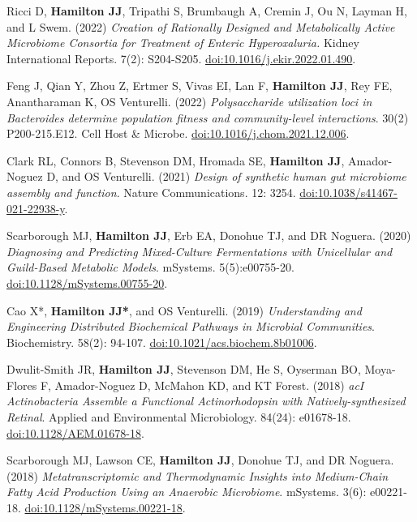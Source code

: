 \documentclass[letterpaper,11pt]{article}
\newlength{\outerbordwidth}
\newcommand{\resheading}[1]{\vspace{8pt}
  \parbox{\textwidth}{
  \setlength{\FrameSep}{\outerbordwidth}
\setlength{\fboxsep}{0pt}
\framebox[\textwidth][l]{\setlength{\fboxsep}{4pt}\fcolorbox{shadecolorB}{shadecolorB}{\textbf{\sffamily{\mbox{~}\makebox[6.262in][l]{\large #1} \vphantom{p\^{E}}}}}}
  }
  \vspace{-5pt}
}
\begin{document}
\resheading{Publications}
\begin{etaremune}[itemsep=-2pt]
	\item Ricci D, \textbf{Hamilton JJ}, Tripathi S, Brumbaugh A, Cremin J, Ou N, Layman H, and L Swem. (2022) \emph{Creation of Rationally Designed and Metabolically Active Microbiome Consortia for Treatment of Enteric Hyperoxaluria.} Kidney International Reports. 7(2): S204-S205. \href{https://www.kireports.org/article/S2468-0249(22)00490-9/fulltext}{doi:10.1016/j.ekir.2022.01.490}.
	\item Feng J, Qian Y, Zhou Z, Ertmer S, Vivas EI, Lan F, \textbf{Hamilton JJ}, Rey FE, Anantharaman K, OS Venturelli. (2022) \emph{Polysaccharide utilization loci in Bacteroides determine population fitness and community-level interactions}. 30(2) P200-215.E12. Cell Host \& Microbe. \href{https://www.cell.com/cell-host-microbe/fulltext/S1931-3128(21)00577-1}{doi:10.1016/j.chom.2021.12.006}.
	\item Clark RL, Connors B, Stevenson DM, Hromada SE, \textbf{Hamilton JJ}, Amador-Noguez D, and OS Venturelli. (2021) \emph{Design of synthetic human gut microbiome assembly and function}. Nature Communications. 12: 3254. \href{https://www.nature.com/articles/s41467-021-22938-y}{doi:10.1038/s41467-021-22938-y}.
	\item Scarborough MJ, \textbf{Hamilton JJ}, Erb EA, Donohue TJ, and DR Noguera. (2020) \emph{Diagnosing and Predicting Mixed-Culture Fermentations with Unicellular and Guild-Based Metabolic Models}. mSystems. 5(5):e00755-20. \href{https://doi.org/10.1128/mSystems.00755-20}{doi:10.1128/mSystems.00755-20}.
	\item Cao X*, \textbf{Hamilton JJ*}, and OS Venturelli. (2019) \emph{Understanding and Engineering Distributed Biochemical Pathways in Microbial Communities}. Biochemistry. 58(2): 94-107. \href{https://doi.org/10.1021/acs.biochem.8b01006}{doi:10.1021/acs.biochem.8b01006}.
	\item Dwulit-Smith JR, \textbf{Hamilton JJ}, Stevenson DM, He S, Oyserman BO, Moya-Flores F, Amador-Noguez D, McMahon KD, and KT Forest. (2018) \emph{acI Actinobacteria Assemble a Functional Actinorhodopsin with Natively-synthesized Retinal}. Applied and Environmental Microbiology. 84(24): e01678-18. \href{https://doi.org/10.1128/AEM.01678-18}{doi:10.1128/AEM.01678-18}.
	\item Scarborough MJ, Lawson CE, \textbf{Hamilton JJ}, Donohue TJ, and DR Noguera. (2018) \emph{Metatranscriptomic and Thermodynamic Insights into Medium-Chain Fatty Acid Production Using an Anaerobic Microbiome}. mSystems. 3(6): e00221-18. \href{https://doi.org/10.1128/mSystems.00221-18}{doi:10.1128/mSystems.00221-18}.

\end{etaremune}
\end{document}
